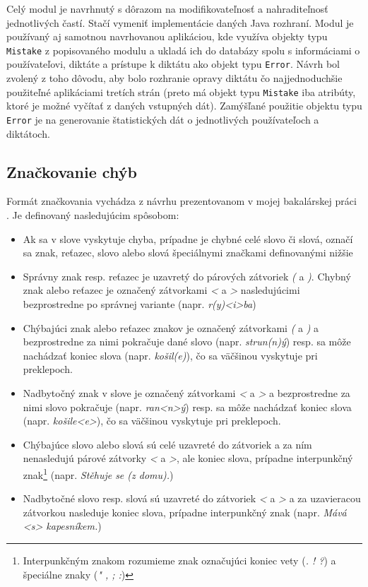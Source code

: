 \documentclass[12pt,oneside]{fithesis2}
\begin{document}
      \par Celý modul je navrhnutý s dôrazom na modifikovateľnosť a nahraditeľnosť jednotlivých častí. Stačí vymeniť implementácie daných Java rozhraní. Modul je používaný aj samotnou navrhovanou aplikáciou, kde využíva objekty typu \texttt{Mistake} z popisovaného modulu a ukladá ich do databázy spolu s informáciami o používateľovi, diktáte a prístupe k diktátu ako objekt typu \texttt{Error}. Návrh bol zvolený z toho dôvodu, aby bolo rozhranie opravy diktátu čo najjednoduchšie použiteľné aplikáciami tretích strán (preto má objekt typu \texttt{Mistake} iba atribúty, ktoré je možné vyčítať z daných vstupných dát). Zamýšľané použitie objektu typu \texttt{Error} je na generovanie štatistických dát o jednotlivých používateľoch a diktátoch.
      
      \subsection{Značkovanie chýb}
      \par Formát značkovania vychádza z návrhu prezentovanom v mojej bakalárskej práci \cite{rumanov12}. Je definovaný nasledujúcim spôsobom:
      \begin{itemize}
	\item Ak sa v slove vyskytuje chyba, prípadne je chybné celé slovo či slová, označí sa znak, reťazec, slovo alebo slová špeciálnymi značkami definovanými nižšie
	\item Správny znak resp. reťazec je uzavretý do párových zátvoriek \textit{(} a \textit{)}. Chybný znak alebo reťazec je označený zátvorkami \textit{<} a \textit{>} nasledujúcimi bezprostredne po správnej variante (napr. \textit{r(y)<i>ba})
	\item Chýbajúci znak alebo reťazec znakov je označený zátvorkami \textit{(} a \textit{)} a bezprostredne za nimi pokračuje dané slovo (napr. \textit{strun(n)ý}) resp. sa môže nachádzať koniec slova (napr. \textit{košil(e)}), čo sa väčšinou vyskytuje pri preklepoch.
	\item Nadbytočný znak v slove je označený zátvorkami \textit{<} a \textit{>} a bezprostredne za nimi slovo pokračuje (napr. \textit{ran<n>ý}) resp. sa môže nachádzať koniec slova (napr. \textit{košile<e>}), čo sa väčšinou vyskytuje pri preklepoch.
	\item Chýbajúce slovo alebo slová sú celé uzavreté do zátvoriek a za ním nenasledujú párové zátvorky \textit{<} a \textit{>}, ale koniec slova, prípadne interpunkčný znak\footnote{Interpunkčným znakom rozumieme znak označujúci koniec vety (\textit{. ! ?}) a špeciálne znaky (\textit{" , ; :})} (napr. \textit{Stěhuje se (z domu).})
	\item Nadbytočné slovo resp. slová sú uzavreté do zátvoriek \textit{<} a \textit{>} a za uzavieracou zátvorkou nasleduje koniec slova, prípadne interpunkčný znak (napr. \textit{Mává <s> kapesníkem.})
	\end{itemize}
\end{document}
